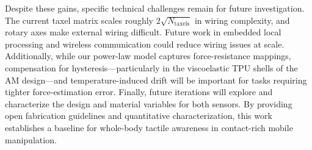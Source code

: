 Despite these gains, specific technical challenges remain for future investigation. The current taxel matrix scales roughly $2\sqrt{N_{\text{taxels}}}$ in wiring complexity, and rotary axes make external wiring difficult. Future work in embedded local processing and wireless communication could reduce wiring issues at scale. Additionally, while our power-law model captures force-resistance mappings, compensation for hysteresis—particularly in the viscoelastic TPU shells of the AM design—and temperature-induced drift will be important for tasks requiring tighter force-estimation error. Finally, future iterations will explore and characterize the design and material variables for both sensors. By providing open fabrication guidelines and quantitative characterization, this work establishes a baseline for whole-body tactile awareness in contact-rich mobile manipulation.
